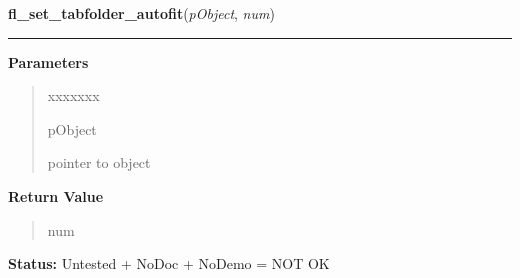 \hspace{.8\funcindent}\begin{boxedminipage}{\funcwidth}

    \raggedright \textbf{fl\_set\_tabfolder\_autofit}(\textit{pObject}, \textit{num})

    \vspace{-1.5ex}

    \rule{\textwidth}{0.5\fboxrule}
\setlength{\parskip}{2ex}
\setlength{\parskip}{1ex}
      \textbf{Parameters}
      \vspace{-1ex}

      \begin{quote}
        \begin{Ventry}{xxxxxxx}

          \item[pObject]

          pointer to object

        \end{Ventry}

      \end{quote}

      \textbf{Return Value}
    \vspace{-1ex}

      \begin{quote}
      num

      \end{quote}

\textbf{Status:} Untested + NoDoc + NoDemo = NOT OK



    \end{boxedminipage}

    \label{xformslib:library:fl_set_default_tabfolder_corner}

    \vspace{0.5ex}


